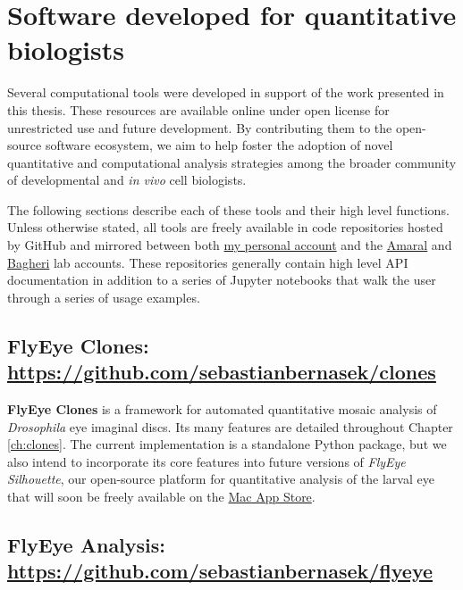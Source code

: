 \section{Software developed for quantitative biologists}
\label{appendix:resources:software}

Several computational tools were developed in support of the work presented in this thesis. These resources are available online under open license for unrestricted use and future development. By contributing them to the open-source software ecosystem, we aim to help foster the adoption of novel quantitative and computational analysis strategies among the broader community of developmental and \textit{in vivo} cell biologists. 

The following sections describe each of these tools and their high level functions. Unless otherwise stated, all tools are freely available in code repositories hosted by GitHub and mirrored between both \href{https://github.com/sebastianbernasek/}{my personal account} and the \href{https://github.com/amarallab}{Amaral} and \href{https://github.com/bagherilab}{Bagheri} lab accounts. These repositories generally contain high level API documentation in addition to a series of Jupyter notebooks that walk the user through a series of usage examples. 

\subsection{\textbf{FlyEye Clones}: \url{https://github.com/sebastianbernasek/clones}}
\label{appendix:resources:clones}

\textbf{FlyEye Clones} is a framework for automated quantitative mosaic analysis of \textit{Drosophila} eye imaginal discs. Its many features are detailed throughout Chapter \ref{ch:clones}. The current implementation is a standalone Python package, but we also intend to incorporate its core features into future versions of \emph{FlyEye Silhouette}, our open-source platform for quantitative analysis of the larval eye that will soon be freely available on the \href{https://www.apple.com/ca/osx/apps/app-store/}{Mac App Store}. 

\subsection{\textbf{FlyEye Analysis}: \url{https://github.com/sebastianbernasek/flyeye}}
\label{appendix:resources:flyeye}

